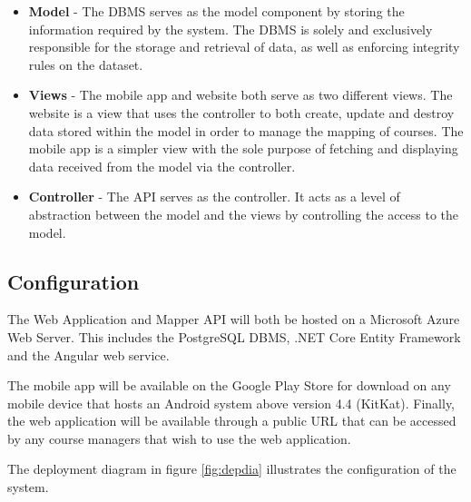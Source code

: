 \documentclass{article}
\begin{document}
    \begin{itemize}
        \item \textbf{Model} - The DBMS serves as the model component by
            storing the information required by the system. The DBMS is solely
            and exclusively responsible for the storage and retrieval of data,
            as well as enforcing integrity rules on the dataset.
        \item \textbf{Views} - The mobile app and website both serve as two
            different views. The website is a view that uses the controller to
            both create, update and destroy data stored within the model in
            order to manage the mapping of courses. The mobile app is a simpler
            view with the sole purpose of fetching and displaying data received
            from the model via the controller.
        \item \textbf{Controller} - The API serves as the controller. It acts
            as a level of abstraction between the model and the views by
            controlling the access to the model.
    \end{itemize}



    \subsection{Configuration}

    The Web Application and Mapper API will both be hosted on a Microsoft Azure
    Web Server. This includes the PostgreSQL DBMS, .NET Core Entity Framework
    and the Angular web service.

    The mobile app will be available on the Google Play Store for download on
    any mobile device that hosts an Android system above version 4.4 (KitKat).
    Finally, the web application will be available through a public URL that
    can be accessed by any course managers that wish to use the web
    application.

    The deployment diagram in figure \ref{fig:depdia} illustrates the
    configuration of the system.
\end{document}
